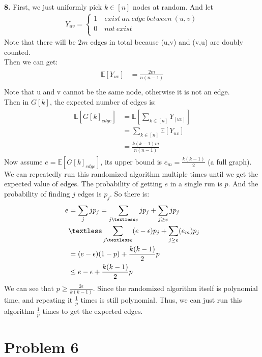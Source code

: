 \documentclass[titlepage, paper=a4, fontsize=11pt]{scrartcl} %
\numberwithin{equation}{section} %
\numberwithin{figure}{section} %
\numberwithin{table}{section} %
\begin{document}
\textbf{8.}
First, we just uniformly pick $k \in [n]$ nodes at random. And let
\begin{gather*}
Y_{uv} =
\begin{cases}
1 \quad exist\ an\ edge\ between\ (u,v) \\
0 \quad not\ exist \\
\end{cases}
\end{gather*}
Note that there will be $2m$ edges in total because (u,v) and (v,u) are doubly counted. \\
Then we can get:
\begin{align*} 
\begin{split}
\mathbb{E}[Y_{uv}] &= \frac{2m}{n(n-1)} \\
\end{split}					
\end{align*}
Note that u and v cannot be the same node, otherwise it is not an edge. \\
Then in $G[k]$, the expected number of edges is:
\begin{align*} 
\begin{split}
\mathbb{E}[G[k]_{edge}] &= \mathbb{E}[\sum_{k \in [n]} Y_[uv]] \\
&= \sum_{k \in [n]} \mathbb{E}[Y_{uv}] \\
&= \frac{k(k-1)m}{n(n-1)}
\end{split}					
\end{align*}
Now assume $e=\mathbb{E}[G[k]_{edge}]$, its upper bound is $e_m = \frac{k(k-1)}{2}$ (a full graph).
We can repeatedly run this randomized algorithm multiple times until we get the expected value of edges. The probability of getting $e$ in a single run is $p$. And the probability of finding $j$ edges is $p_j$.
So there is:
\begin{align*} 
\begin{split}
e &= \sum_{j}jp_j = \sum_{j \textless e}jp_j + \sum_{j \geq e}jp_j \\
&\textless \sum_{j \textless e}(e - \epsilon)p_j + \sum_{j \geq e}(e_m)p_j \\
&= (e-\epsilon)(1-p) + \frac{k(k-1)}{2}p \\
&\leq e - \epsilon + \frac{k(k-1)}{2}p
\end{split}					
\end{align*}
We can see that $p \geq \frac{2\epsilon}{k(k-1)}$. Since the randomized algorithm itself is polynomial time, and repeating it $\frac{1}{p}$ times is still polynomial. Thus, we can just run this algorithm $\frac{1}{p}$ times to get the expected edges.
\\



\section*{Problem 6}
\end{document}
